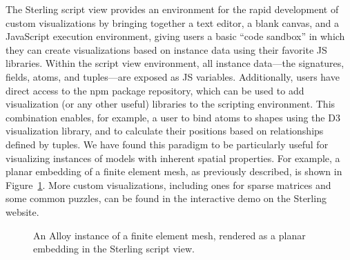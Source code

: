 \documentclass[runningheads]{llncs}
\begin{document}
The Sterling script view provides an environment for the rapid development of custom visualizations by bringing together a text editor, a blank canvas, and a JavaScript execution environment, giving users a basic ``code sandbox'' in which they can create visualizations based on instance data using their favorite JS libraries.
Within the script view environment, all instance data---the signatures, fields, atoms, and tuples---are exposed as JS variables. 
Additionally, users have direct access to the npm package repository, which can be used to add visualization (or any other useful) libraries to the scripting environment.
This combination enables, for example, a user to bind atoms to shapes using the D3 visualization library, and to calculate their positions based on relationships defined by tuples.
We have found this paradigm to be particularly useful for visualizing instances of models with inherent spatial properties.
For example, a planar embedding of a finite element mesh, as previously described, is shown in Figure~\ref{fig:script}. More custom visualizations, including ones for sparse matrices and some common puzzles, can be found in the interactive demo on the Sterling website.

\begin{figure}
    \centering
    \caption{An Alloy instance of a finite element mesh, rendered as a planar embedding in the Sterling script view.
    }
    \label{fig:script}
\end{figure}
\end{document}
